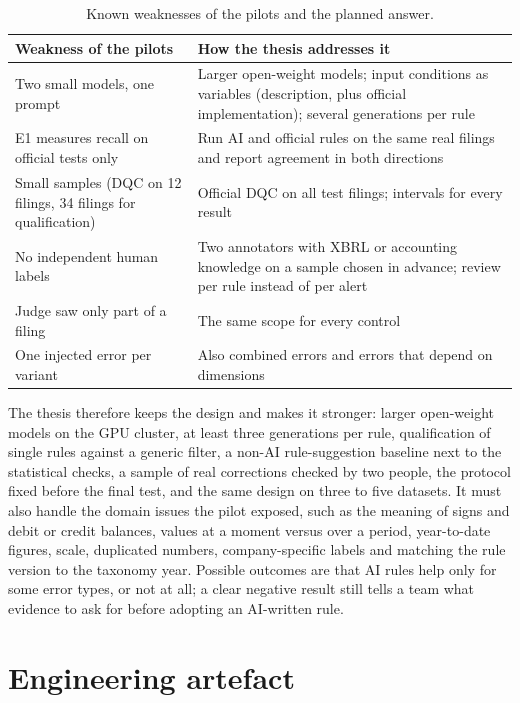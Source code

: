 \documentclass[11pt,a4paper]{article}
\begin{document}
\begin{table}[htbp]
\centering
\small
\begin{tabularx}{\textwidth}{@{}LL@{}}
\toprule
Weakness of the pilots & How the thesis addresses it \\
\midrule
Two small models, one prompt & Larger open-weight models; input conditions as variables (description, plus official implementation); several generations per rule \\
E1 measures recall on official tests only & Run AI and official rules on the same real filings and report agreement in both directions \\
Small samples (DQC on 12 filings, 34 filings for qualification) & Official DQC on all test filings; intervals for every result \\
No independent human labels & Two annotators with XBRL or accounting knowledge on a sample chosen in advance; review per rule instead of per alert \\
Judge saw only part of a filing & The same scope for every control \\
One injected error per variant & Also combined errors and errors that depend on dimensions \\
\bottomrule
\end{tabularx}
\caption{Known weaknesses of the pilots and the planned answer.}
\label{tab:weak}
\end{table}

The thesis therefore keeps the design and makes it stronger: larger open-weight models on the GPU cluster, at least three generations per rule, qualification of single rules against a generic filter, a non-AI rule-suggestion baseline next to the statistical checks, a sample of real corrections checked by two people, the protocol fixed before the final test, and the same design on three to five datasets. It must also handle the domain issues the pilot exposed, such as the meaning of signs and debit or credit balances, values at a moment versus over a period, year-to-date figures, scale, duplicated numbers, company-specific labels and matching the rule version to the taxonomy year. Possible outcomes are that AI rules help only for some error types, or not at all; a clear negative result still tells a team what evidence to ask for before adopting an AI-written rule.

\section{Engineering artefact}
\end{document}
